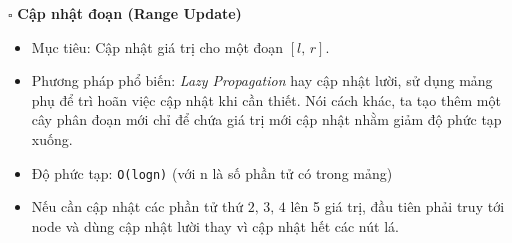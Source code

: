 \documentclass[a4paper]{article}
\begin{document}
\noindent $\square$ \textbf{Cập nhật đoạn (Range Update)}
\begin{itemize}[label = $\circ$]
    \item Mục tiêu: Cập nhật giá trị cho một đoạn $[l,\,r]$.
    \item Phương pháp phổ biến: \textit{Lazy Propagation} hay cập nhật lười, sử dụng mảng phụ để trì hoãn việc cập nhật khi cần thiết. Nói cách khác, ta tạo thêm một cây phân đoạn mới chỉ để chứa giá trị mới cập nhật nhằm giảm độ phức tạp xuống.
    \item Độ phức tạp: \texttt{O(logn)} (với n là số phần tử có trong mảng)
    \item Nếu cần cập nhật các phần tử thứ $2,\,3,\,4$ lên 5 giá trị, đầu tiên phải truy tới node và dùng cập nhật lười thay vì cập nhật hết các nút lá.
    \begin{table}[tbh!]
        \large
        \centering
        \begin{minipage}[t]{1.8in}
        \end{minipage}
        \begin{minipage}[c]{1in}
            \begin{center}
            \end{center}
        \end{minipage}
        \begin{minipage}[t]{1.6in}
\end{minipage}
\end{table}
\end{itemize}
\end{document}
